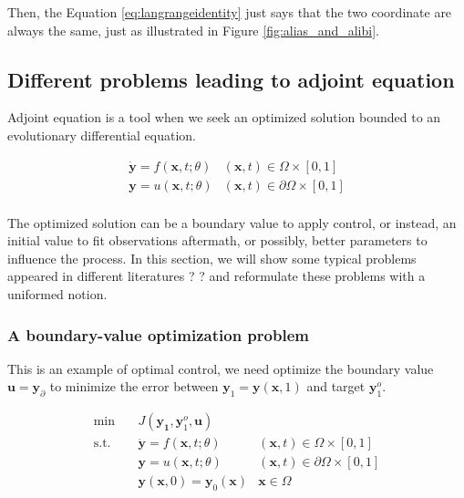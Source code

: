 \documentclass{article}
\begin{document}
Then, the Equation \ref{eq:langrangeidentity} just says that the two coordinate are always the same, just as illustrated in Figure \ref{fig:alias_and_alibi}.

\subsection{Different problems leading to adjoint equation}

Adjoint equation is a tool when we seek an optimized solution bounded to an evolutionary differential equation.

\begin{equation}
\begin{array}{ll}
\dot{\mathbf{y}} = f(\mathbf{x}, t; \theta) & (\mathbf{x}, t) \in \Omega \times [0, 1] \\
\mathbf{y} = u(\mathbf{x}, t; \theta) & (\mathbf{x}, t) \in \partial \Omega \times [0, 1] \\
\end{array}
\end{equation}

The optimized solution can be a boundary value to apply control, or instead, an initial value to fit observations aftermath, or possibly, better parameters to influence the process.
In this section, we will show some typical problems appeared in different literatures ? \cite{Liberzon2012CalculusOV}\cite{hall1983physical}\cite{Errico1997WhatIA} ? and reformulate these problems with a uniformed notion.

\subsubsection{A boundary-value optimization problem}

This is an example of optimal control, we need optimize the boundary value $ \mathbf{u} = \mathbf{y}_{\partial} $ to minimize the error between $ \mathbf{y}_1 = \mathbf{y}(\mathbf{x}, 1)$ and target $ \mathbf{y}_1^o $.

$$
\begin{array}{rcll}
\min &~& J(\mathbf{y_1}, \mathbf{y}_1^o, \mathbf{u}) & \\
\mathrm{s.t.} &~& \dot{\mathbf{y}} = f(\mathbf{x}, t; \theta) & (\mathbf{x}, t) \in \Omega \times [0, 1] \\
&~& \mathbf{y} = u(\mathbf{x}, t; \theta) & (\mathbf{x}, t) \in \partial \Omega \times [0, 1] \\
&~& \mathbf{y}(\mathbf{x}, 0) = \mathbf{y}_0(\mathbf{x}) & \mathbf{x} \in \Omega
\end{array}
$$
\end{document}

